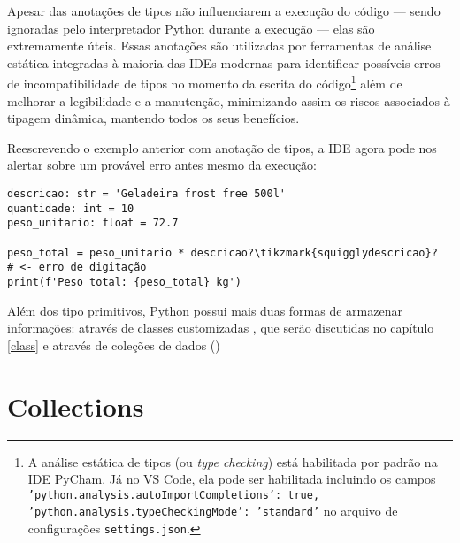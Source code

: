 Apesar das anotações de tipos não influenciarem a execução do código --- sendo ignoradas pelo interpretador Python
durante a execução --- elas são extremamente úteis.
Essas anotações são utilizadas por ferramentas de análise estática integradas à maioria das IDEs modernas para
identificar possíveis erros de incompatibilidade de tipos no momento da escrita do
código\footnote{A análise estática de tipos (ou \emph{type checking}) está habilitada por padrão na IDE PyCham.
Já no VS Code, ela pode ser habilitada incluindo os campos
\texttt{'python.analysis.autoImportCompletions': true,} \texttt{'python.analysis.typeCheckingMode': 'standard'} no arquivo de
configurações \texttt{settings.json}.
}
além de melhorar a legibilidade e a manutenção, minimizando assim os riscos associados à tipagem dinâmica, mantendo
todos os seus benefícios.

Reescrevendo o exemplo anterior com anotação de tipos, a IDE agora pode nos alertar sobre um provável erro antes
mesmo da execução:
\begin{verbatim}
descricao: str = 'Geladeira frost free 500l'
quantidade: int = 10
peso_unitario: float = 72.7

peso_total = peso_unitario * descricao?\tikzmark{squigglydescricao}?   # <- erro de digitação
print(f'Peso total: {peso_total} kg')
\end{verbatim}
%

Além dos tipo primitivos, Python possui mais duas formas de armazenar informações: através de classes customizadas
, que serão discutidas no capítulo \ref{class} e através de coleções de dados ()




\section{Collections}

